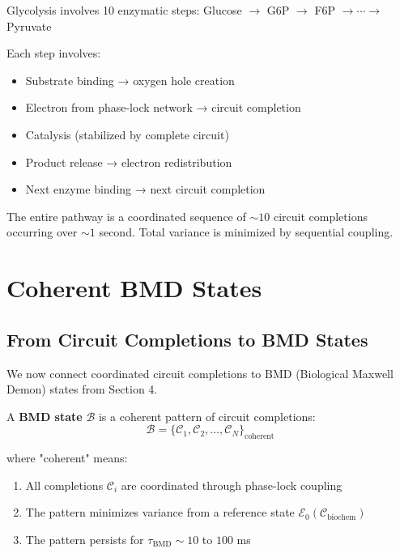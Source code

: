 \begin{example}
Glycolysis involves 10 enzymatic steps: Glucose $\to$ G6P $\to$ F6P $\to \cdots \to$ Pyruvate

Each step involves:
\begin{itemize}
\item Substrate binding → oxygen hole creation
\item Electron from phase-lock network → circuit completion
\item Catalysis (stabilized by complete circuit)
\item Product release → electron redistribution
\item Next enzyme binding → next circuit completion
\end{itemize}

The entire pathway is a coordinated sequence of $\sim 10$ circuit completions occurring over $\sim 1$ second. Total variance is minimized by sequential coupling.
\end{example}

\section{Coherent BMD States}

\subsection{From Circuit Completions to BMD States}

We now connect coordinated circuit completions to BMD (Biological Maxwell Demon) states from Section 4.

\begin{definition}
\label{def:bmd_via_circuits}
A \textbf{BMD state} $\mathcal{B}$ is a coherent pattern of circuit completions:
\begin{equation}
\mathcal{B} = \{\mathcal{C}_1, \mathcal{C}_2, \ldots, \mathcal{C}_N\}_{\text{coherent}}
\end{equation}

where "coherent" means:
\begin{enumerate}
\item All completions $\mathcal{C}_i$ are coordinated through phase-lock coupling
\item The pattern minimizes variance from a reference state $\mathcal{E}_0(\mathcal{C}_{\text{biochem}})$
\item The pattern persists for $\tau_{\text{BMD}} \sim 10$ to $100$ ms
\end{enumerate}
\end{definition}

